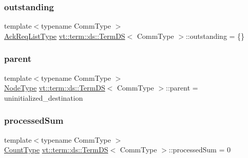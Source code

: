 \mbox{\label{structvt_1_1term_1_1ds_1_1_term_d_s_a345a64aa827f72e541f9725f7ea2cbf8}} 
\subsubsection{\texorpdfstring{outstanding}{outstanding}}
{\footnotesize\ttfamily template$<$typename Comm\+Type $>$ \\
\hyperlink{structvt_1_1term_1_1ds_1_1_term_d_s_a9d4102aa0577c3b077befc48c1a88842}{Ack\+Req\+List\+Type} \hyperlink{structvt_1_1term_1_1ds_1_1_term_d_s}{vt\+::term\+::ds\+::\+Term\+DS}$<$ Comm\+Type $>$\+::outstanding = \{\}\hspace{0.3cm}{\ttfamily [protected]}}

\mbox{\label{structvt_1_1term_1_1ds_1_1_term_d_s_a904c12ccc672c4849af1cc6e89a91c54}} 
\subsubsection{\texorpdfstring{parent}{parent}}
{\footnotesize\ttfamily template$<$typename Comm\+Type $>$ \\
\hyperlink{namespacevt_a866da9d0efc19c0a1ce79e9e492f47e2}{Node\+Type} \hyperlink{structvt_1_1term_1_1ds_1_1_term_d_s}{vt\+::term\+::ds\+::\+Term\+DS}$<$ Comm\+Type $>$\+::parent = uninitialized\+\_\+destination\hspace{0.3cm}{\ttfamily [protected]}}

\mbox{\label{structvt_1_1term_1_1ds_1_1_term_d_s_ad82335b84b7ac759e94fa524c59b03d9}} 
\subsubsection{\texorpdfstring{processed\+Sum}{processedSum}}
{\footnotesize\ttfamily template$<$typename Comm\+Type $>$ \\
\hyperlink{structvt_1_1term_1_1ds_1_1_term_d_s_a54f4ebd7e1ecb59c32c0f5b03ef9f20b}{Count\+Type} \hyperlink{structvt_1_1term_1_1ds_1_1_term_d_s}{vt\+::term\+::ds\+::\+Term\+DS}$<$ Comm\+Type $>$\+::processed\+Sum = 0\hspace{0.3cm}{\ttfamily [protected]}}

